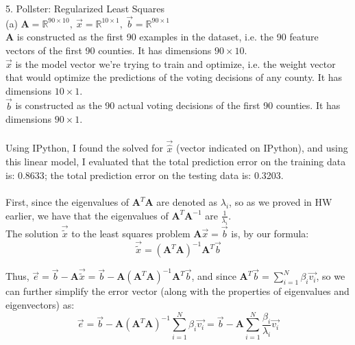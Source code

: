 \documentclass{article}
\begin{document}
{\Large 5. Pollster: Regularized Least Squares} \\[.5cm]
{\color{red} (a) $\mathbf{A} = \mathbb{R}^{90\times10},\
\vec{x} = \mathbb{R}^{10\times1},\
\vec{b} = \mathbb{R}^{90\times1}$ } \\

$\mathbf{A}$ is constructed as the first 90 examples in the dataset, i.e. the 90 feature vectors of the first 90 counties. It has dimensions $90\times10$. \\

$\vec{x}$ is the model vector we're trying to train and optimize, i.e. the weight vector that would optimize the predictions of the voting decisions of any county. It has dimensions $10\times1$. \\

$\vec{b}$ is constructed as the 90 actual voting decisions of the first 90 counties. It has dimensions $90\times1$. \\

\noindent {\color{red} (b) } \\

Using IPython, I found the solved for $\vec{\hat{x}}$ (vector indicated on IPython), and using this linear model, I evaluated that the total prediction error on the {\color{blue} training} data is: {\color{red} 0.8633}; the total prediction error on the {\color{blue} testing} data is: {\color{red} 0.3203}. \\

\noindent {\color{red} (c) Direct Proof } \\

First, since the eigenvalues of $\mathbf{A}^T\mathbf{A}$ are denoted as $\lambda_i$, so as we proved in HW earlier, we have that the eigenvalues of $\mathbf{A}^T\mathbf{A}^{-1}$ are
$\frac{1}{\lambda_i}$. \\

The solution $\vec{\tilde{x}}$ to the least squares problem $\mathbf{A}\vec{x} = \vec{b}$ is, by our formula:
$$\vec{\tilde{x}} =
(\mathbf{A}^T \mathbf{A})^{-1} \mathbf{A}^T \vec{b}$$

Thus, $\vec{e} = \vec{b} - \mathbf{A}\vec{\tilde{x}} =
\vec{b} - \mathbf{A} (\mathbf{A}^T \mathbf{A})^{-1} \mathbf{A}^T \vec{b}$, and since
$\mathbf{A}^T \vec{b} =
	\sum\limits_{i=1}^{N} \beta_i\vec{v_i}$,
so we can further simplify the error vector (along with the properties of eigenvalues and eigenvectors) as:
$$\vec{e} =
\vec{b} - \mathbf{A} (\mathbf{A}^T \mathbf{A})^{-1}
	\sum\limits_{i=1}^{N} \beta_i\vec{v_i} =
\vec{b} - \mathbf{A}
	\sum\limits_{i=1}^N \frac{\beta_i}{\lambda_i} \vec{v_i} $$
\end{document}
